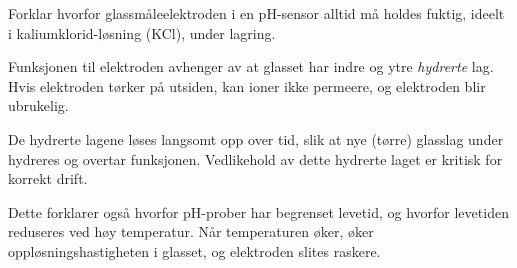 

Forklar hvorfor glassmåleelektroden i en pH-sensor alltid må holdes fuktig, ideelt i kaliumklorid-løsning (KCl), under lagring.







Funksjonen til elektroden avhenger av at glasset har indre og ytre {\it hydrerte} lag. Hvis elektroden tørker på utsiden, kan ioner ikke permeere, og elektroden blir ubrukelig.

De hydrerte lagene løses langsomt opp over tid, slik at nye (tørre) glasslag under hydreres og overtar funksjonen. Vedlikehold av dette hydrerte laget er kritisk for korrekt drift.

Dette forklarer også hvorfor pH-prober har begrenset levetid, og hvorfor levetiden reduseres ved høy temperatur. Når temperaturen øker, øker oppløsningshastigheten i glasset, og elektroden slites raskere.










